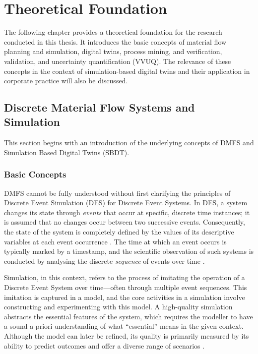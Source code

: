 \chapter{Theoretical Foundation}
\label{chap:theory}

The following chapter provides a theoretical foundation for the research conducted in this thesis. It introduces the basic concepts of material flow planning and simulation, digital twins, process mining, and verification, validation, and uncertainty quantification (VVUQ). The relevance of these concepts in the context of simulation-based digital twins and their application in corporate practice will also be discussed.


\section{Discrete Material Flow Systems and Simulation}
This section begins with an introduction of the underlying concepts of DMFS and Simulation Based Digital Twins (SBDT).
\label{sec:material-flow}
\subsection{Basic Concepts}
DMFS cannot be fully understood without first clarifying the principles of Discrete Event Simulation (DES) for Discrete Event Systems. In DES, a system changes its state through \textit{events} that occur at specific, discrete time instances; it is assumed that no changes occur between two successive events. Consequently, the state of the system is completely defined by the values of its descriptive variables at each event occurrence \autocite{varga2001discrete}. The time at which an event occurs is typically marked by a timestamp, and the scientific observation of such systems is conducted by analysing the discrete \textit{sequence} of events over time \autocite{robinson2014simulation}.

Simulation, in this context, refers to the process of imitating the operation of a Discrete Event System over time—often through multiple event sequences. This imitation is captured in a model, and the core activities in a simulation involve constructing and experimenting with this model. A high-quality simulation abstracts the essential features of the system, which requires the modeller to have a sound a priori understanding of what “essential” means in the given context. Although the model can later be refined, its quality is primarily measured by its ability to predict outcomes and offer a diverse range of scenarios \autocite{maria1997introduction}.


